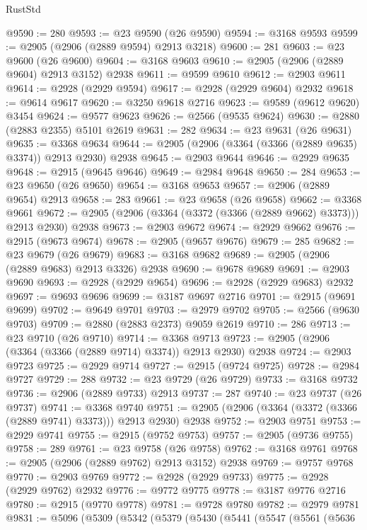 \begin{lexlean}{RustStd}
\begin{coremodule}
{\begin{coremodule}
{{{{{{{{{{{{{{{{{{{{{{{{{{{{{{{{{{{{{{{{{{{{{{{{{{{{{{{{{{{{{{{{{{{{{{{{{{{{{{@9590 := 280
@9593 := @23 @9590 (@26 @9590)
@9594 := @3168 @9593
@9599 := @2905 (@2906 (@2889 @9594) @2913 @3218)
@9600 := 281
@9603 := @23 @9600 (@26 @9600)
@9604 := @3168 @9603
@9610 := @2905 (@2906 (@2889 @9604) @2913 @3152) @2938
@9611 := @9599 @9610
@9612 := @2903 @9611
@9614 := @2928 (@2929 @9594)
@9617 := @2928 (@2929 @9604) @2932
@9618 := @9614 @9617
@9620 := @3250 @9618 @2716
@9623 := @9589 (@9612 @9620) @3454
@9624 := @9577 @9623
@9626 := @2566 (@9535 @9624)
@9630 := @2880 (@2883 @2355) @5101 @2619
@9631 := 282
@9634 := @23 @9631 (@26 @9631)
@9635 := @3368 @9634
@9644 := @2905 (@2906 (@3364 (@3366 (@2889 @9635) @3374)) @2913 @2930) @2938
@9645 := @2903 @9644
@9646 := @2929 @9635
@9648 := @2915 (@9645 @9646)
@9649 := @2984 @9648
@9650 := 284
@9653 := @23 @9650 (@26 @9650)
@9654 := @3168 @9653
@9657 := @2906 (@2889 @9654) @2913
@9658 := 283
@9661 := @23 @9658 (@26 @9658)
@9662 := @3368 @9661
@9672 := @2905 (@2906 (@3364 (@3372 (@3366 (@2889 @9662) @3373))) @2913 @2930) @2938
@9673 := @2903 @9672
@9674 := @2929 @9662
@9676 := @2915 (@9673 @9674)
@9678 := @2905 (@9657 @9676)
@9679 := 285
@9682 := @23 @9679 (@26 @9679)
@9683 := @3168 @9682
@9689 := @2905 (@2906 (@2889 @9683) @2913 @3326) @2938
@9690 := @9678 @9689
@9691 := @2903 @9690
@9693 := @2928 (@2929 @9654)
@9696 := @2928 (@2929 @9683) @2932
@9697 := @9693 @9696
@9699 := @3187 @9697 @2716
@9701 := @2915 (@9691 @9699)
@9702 := @9649 @9701
@9703 := @2979 @9702
@9705 := @2566 (@9630 @9703)
@9709 := @2880 (@2883 @2373) @9059 @2619
@9710 := 286
@9713 := @23 @9710 (@26 @9710)
@9714 := @3368 @9713
@9723 := @2905 (@2906 (@3364 (@3366 (@2889 @9714) @3374)) @2913 @2930) @2938
@9724 := @2903 @9723
@9725 := @2929 @9714
@9727 := @2915 (@9724 @9725)
@9728 := @2984 @9727
@9729 := 288
@9732 := @23 @9729 (@26 @9729)
@9733 := @3168 @9732
@9736 := @2906 (@2889 @9733) @2913
@9737 := 287
@9740 := @23 @9737 (@26 @9737)
@9741 := @3368 @9740
@9751 := @2905 (@2906 (@3364 (@3372 (@3366 (@2889 @9741) @3373))) @2913 @2930) @2938
@9752 := @2903 @9751
@9753 := @2929 @9741
@9755 := @2915 (@9752 @9753)
@9757 := @2905 (@9736 @9755)
@9758 := 289
@9761 := @23 @9758 (@26 @9758)
@9762 := @3168 @9761
@9768 := @2905 (@2906 (@2889 @9762) @2913 @3152) @2938
@9769 := @9757 @9768
@9770 := @2903 @9769
@9772 := @2928 (@2929 @9733)
@9775 := @2928 (@2929 @9762) @2932
@9776 := @9772 @9775
@9778 := @3187 @9776 @2716
@9780 := @2915 (@9770 @9778)
@9781 := @9728 @9780
@9782 := @2979 @9781
@9831 := @5096
    (@5309
      (@5342
        (@5379
          (@5430
            (@5441
              (@5547
                (@5561
                  (@5636
}}}}}}}}}}}}}}}}}}}}}}}}}}}}}}}}}}}}}}}}}}}}}}}}}}}}}}}}}}}}}}}}}}}}}}}}}}}}}}
\end{coremodule}}
\end{coremodule}
\end{lexlean}
